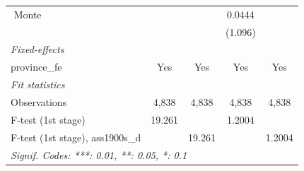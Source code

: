\begin{table}[htbp]
\begin{tabular}{lcccc}
$$      Monte                            &                        &                             & 0.0444                 &   \\   
                                       &                        &                             & (1.096)                &   \\   
      \midrule
      \emph{Fixed-effects}\\
      province\_fe                     & Yes                    & Yes                         & Yes                    & Yes\\  
      \midrule
      \emph{Fit statistics}\\
      Observations                     & 4,838                  & 4,838                       & 4,838                  & 4,838\\  
      F-test (1st stage)               & 19.261                 &                             & 1.2004                 & \\  
      F-test (1st stage), ass1900s\_d  &                        & 19.261                      &                        & 1.2004\\  
      \midrule \midrule
      \multicolumn{5}{l}{\emph{Signif. Codes: ***: 0.01, **: 0.05, *: 0.1}}\\
   \end{tabular}
\end{table}


